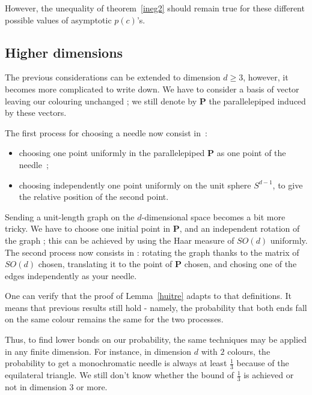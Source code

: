 \documentclass[a4paper,11pt]{article}
\theoremstyle{definition}
\theoremstyle{remark}
\begin{document}
However, the unequality of theorem~\ref{ineg2} should remain true for these different possible values of asymptotic $p(c)$'s.

\subsection{Higher dimensions}
\label{dim}
The previous considerations can be extended to dimension $d \geq 3$, however, 
it becomes more complicated to write down. We have to consider a basis of 
vector leaving our colouring unchanged ; we still denote by $\mathbf{P}$ the 
parallelepiped induced by these vectors.

The first process for choosing a needle now consist in~: 
\begin{itemize}
	\item choosing one point uniformly in the parallelepiped $ \mathbf{P} $ as 
	one point of the needle~;
	\item choosing independently one point uniformly on the unit sphere 
	$S^{d-1}$, to give the relative position of the second point.
\end{itemize}

Sending a unit-length graph on the $d$-dimensional space becomes a bit more 
tricky. We have to choose one initial point in $ \mathbf{P} $, and an independent 
rotation of the graph ; this can be achieved 
by using the Haar measure of $SO(d)$ uniformly. The second process now consists 
in : rotating the graph thanks to the matrix of $SO(d)$ chosen, translating it 
to the point of $\mathbf{P}$ chosen, and chosing one of the 
edges independently as your needle.

One can verify that the proof of Lemma~\ref{huitre} adapts to that definitions. 
It means that previous results still hold - namely, the probability that both 
ends fall on the same colour remains the same for the two processes.

Thus, to find lower bonds on our probability, the same techniques may be applied 
in any finite dimension. For instance, in dimension $d$ with $2$ colours,
the probability to get a monochromatic  
needle is always at least $\frac{1}{3}$ because of the equilateral triangle. 
We still don't know whether the bound of $\frac{1}{3}$ is achieved or not in 
dimension $3$ or more.
\end{document}
